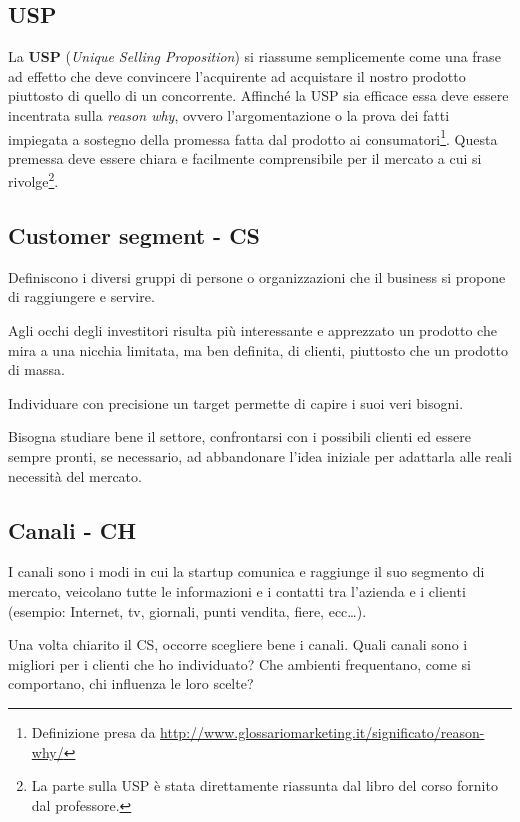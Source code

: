 \subsection{USP}

La \textbf{USP} (\textit{Unique Selling Proposition}) si riassume semplicemente 
come una frase ad effetto che deve convincere l'acquirente ad acquistare il 
nostro prodotto piuttosto di quello di un concorrente.
Affinché la USP sia efficace essa deve essere incentrata sulla \textit{reason 
why}, ovvero l’argomentazione o la prova dei fatti impiegata a sostegno della 
promessa fatta dal prodotto ai consumatori\footnote{Definizione presa da 
\url{http://www.glossariomarketing.it/significato/reason-why/}}. Questa 
premessa deve essere chiara e facilmente comprensibile per il mercato a cui si 
rivolge\footnote{La parte sulla USP è stata direttamente riassunta dal libro 
del corso fornito dal professore.}.

\subsection{Customer segment - CS}

Definiscono i diversi gruppi di persone o organizzazioni che il business si
propone di raggiungere e servire.

Agli occhi degli investitori risulta più interessante e apprezzato un prodotto
che mira a una nicchia limitata, ma ben definita, di clienti, piuttosto che un
prodotto di massa.

Individuare con precisione un target permette di capire i suoi veri bisogni.

Bisogna studiare bene il settore, confrontarsi con i possibili clienti ed
essere sempre pronti, se necessario, ad abbandonare l'idea iniziale per
adattarla alle reali necessità del mercato.

\subsection{Canali - CH}

I canali sono i modi in cui la startup comunica e raggiunge il suo segmento
di mercato, veicolano tutte le informazioni e i contatti tra l'azienda e i
clienti (esempio: Internet, tv, giornali, punti vendita, fiere, ecc\dots).

Una volta chiarito il CS, occorre scegliere bene i canali. Quali canali sono
i migliori per i clienti che ho individuato? Che ambienti frequentano, come
si comportano, chi influenza le loro scelte?

